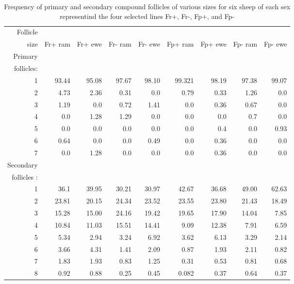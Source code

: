 \begin{table}[ht]
\small
\centering
\caption{Frequency of primary and secondary compound follicles of various sizes  for six sheep of each sex representind the four selected lines Fr+, Fr-, Fp+, and Fp-}
\vspace{0.1in}
\label{tab:freqfoll}
\begin{tabular}{rrrrrrrrr}
  \hline
  Follicle & & & & & & & & \\
  size & Fr+ ram & Fr+ ewe & Fr- ram & Fr- ewe & Fp+ ram & Fp+ ewe &  Fp- ram  & Fp- ewe  \\ 
  \hline
 Primary & & & & & & & & \\
 follicles: & & & & & & & & \\
  1 & 93.44 & 95.08 & 97.67 & 98.10 & 99.321 & 98.19 & 97.38 & 99.07 \\
  2 & 4.73  & 2.36  & 0.31  & 0.0   & 0.79   & 0.33  & 1.26  & 0.0   \\
  3 & 1.19  & 0.0   & 0.72  & 1.41  & 0.0    & 0.36  & 0.67  & 0.0  \\
  4 & 0.0   & 1.28  & 1.29  & 0.0   & 0.0    & 0.0   & 0.7   & 0.0  \\
  5 & 0.0   & 0.0   & 0.0   & 0.0   & 0.0    & 0.4   & 0.0   & 0.93  \\
  6 & 0.64  & 0.0   & 0.0   & 0.49  & 0.0    & 0.36  & 0.0   & 0.0  \\
  7 & 0.0   & 1.28  & 0.0   & 0.0   & 0.0    & 0.36  & 0.0   & 0.0  \\
   \hline
  Secondary & & & & & & & & \\
 follicles : & & & & & & & & \\
  1 & 36.1  & 39.95  & 30.21  & 30.97  & 42.67  & 36.68  & 49.00  & 62.63 \\
  2 & 23.81 & 20.15  & 24.34  & 23.52  & 23.55  & 23.80  & 21.43  & 18.49 \\
  3 & 15.28 & 15.00  & 24.16  & 19.42  & 19.65  & 17.90  & 14.04  & 7.85  \\
  4 & 10.84 & 11.03  & 15.51  & 14.41  & 9.09  & 12.38  & 7.91  & 6.59  \\
  5 & 5.34  & 2.94  &  3.24  &  6.92  & 3.62  & 6.13  &  3.29  &  2.14  \\
  6 & 3.66  &  4.31  & 1.41  & 2.09  &  0.87  & 1.93  &  2.11  &  0.82  \\
  7 & 1.83  & 1.93  & 0.83  & 1.25  & 0.31  & 0.53  & 0.81  & 0.68  \\
  8 & 0.92  & 0.88  & 0.25  & 0.45  & 0.082  & 0.37 & 0.64  & 0.37  \\

\end{tabular}
\end{table}

